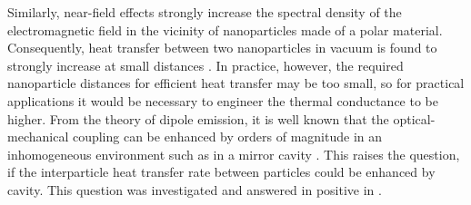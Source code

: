 Similarly, near-field effects strongly increase the spectral density of the electromagnetic field in the vicinity of nanoparticles made of a polar material. Consequently, heat transfer between two nanoparticles in vacuum is found to strongly increase at small distances \cite{domingues05}. In practice, however, the required nanoparticle distances for efficient heat transfer may be too small, so for practical applications it would be necessary to engineer the thermal conductance to be higher. From the theory of dipole emission, it is well known that the optical-mechanical coupling can be enhanced by orders of magnitude in an inhomogeneous environment such as in a mirror cavity \cite{novotny}. This raises the question, if the interparticle heat transfer rate between particles could be enhanced by cavity. This question was investigated and answered in positive in .











